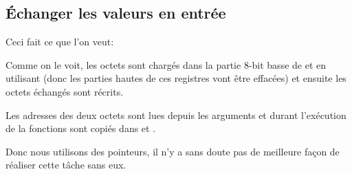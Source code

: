 \subsection{Échanger les valeurs en entrée}

Ceci fait ce que l'on veut:



Comme on le voit, les octets sont chargés dans la partie 8-bit basse de 
et  en utilisant  (donc les parties hautes de ces registres vont
être effacées) et ensuite les octets échangés sont récrits.



Les adresses des deux octets sont lues depuis les arguments et durant l'exécution
de la fonctions sont copiés dans  et .

Donc nous utilisons des pointeurs, il n'y a sans doute pas de meilleure façon de
réaliser cette tâche sans eux.

